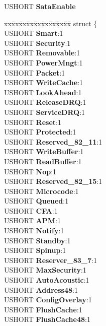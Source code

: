 \begin{DoxyCompactItemize}
U\+S\+H\+O\+RT {\bfseries Sata\+Enable}
\item 
\mbox{\label{struct___i_d_e_n_t_i_f_y___d_a_t_a_aa0bfe75610fc29f9a8599ffa26901f7f}} 
\begin{tabbing}
xx\=xx\=xx\=xx\=xx\=xx\=xx\=xx\=xx\=\kill
struct \{\\
\>USHORT {\bfseries Smart}:1\\
\>USHORT {\bfseries Security}:1\\
\>USHORT {\bfseries Removable}:1\\
\>USHORT {\bfseries PowerMngt}:1\\
\>USHORT {\bfseries Packet}:1\\
\>USHORT {\bfseries WriteCache}:1\\
\>USHORT {\bfseries LookAhead}:1\\
\>USHORT {\bfseries ReleaseDRQ}:1\\
\>USHORT {\bfseries ServiceDRQ}:1\\
\>USHORT {\bfseries Reset}:1\\
\>USHORT {\bfseries Protected}:1\\
\>USHORT {\bfseries Reserved\_82\_11}:1\\
\>USHORT {\bfseries WriteBuffer}:1\\
\>USHORT {\bfseries ReadBuffer}:1\\
\>USHORT {\bfseries Nop}:1\\
\>USHORT {\bfseries Reserved\_82\_15}:1\\
\>USHORT {\bfseries Microcode}:1\\
\>USHORT {\bfseries Queued}:1\\
\>USHORT {\bfseries CFA}:1\\
\>USHORT {\bfseries APM}:1\\
\>USHORT {\bfseries Notify}:1\\
\>USHORT {\bfseries Standby}:1\\
\>USHORT {\bfseries Spinup}:1\\
\>USHORT {\bfseries Reserver\_83\_7}:1\\
\>USHORT {\bfseries MaxSecurity}:1\\
\>USHORT {\bfseries AutoAcoustic}:1\\
\>USHORT {\bfseries Address48}:1\\
\>USHORT {\bfseries ConfigOverlay}:1\\
\>USHORT {\bfseries FlushCache}:1\\
\>USHORT {\bfseries FlushCache48}:1\\

\end{tabbing}
\end{DoxyCompactItemize}
